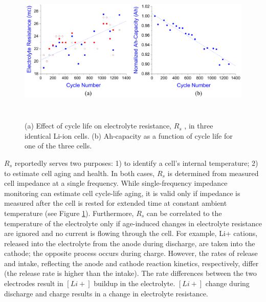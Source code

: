 \begin{figure}[H]
	\includegraphics[width=16cm,height=7cm]{figures/electrolyte1}
	\centering
	\caption{(a) Effect of cycle life on electrolyte resistance, $R_s$ , in three identical Li-ion cells. (b) Ah-capacity as a function of cycle life for one of the three cells.} \label{electrolyte1}
\end{figure}

\hspace{0.5cm}
$R_s$  reportedly serves two purposes: 1) to identify a cell’s internal temperature; 2) to estimate cell aging and health. In both cases, $R_s$ is determined from measured cell impedance at a single frequency. While single-frequency impedance monitoring can estimate cell cycle-life aging, it is valid only if impedance is measured after the cell is rested for extended time at constant ambient temperature (see Figure \ref{electrolyte1}). Furthermore, $R_s$ can be correlated to the temperature of the electrolyte only if age-induced changes in electrolyte resistance are ignored and no current is flowing through the cell. For example, Li+ cations, released into the electrolyte from the anode during discharge, are taken into the cathode; the opposite process occurs during charge. However, the rates of release and intake, reflecting the anode and cathode reaction kinetics, respectively, differ (the release rate is higher than the intake). The rate differences between the two electrodes result in $[Li+]$ buildup in the electrolyte. $[Li+]$ change during discharge and charge results in a change in electrolyte resistance.


